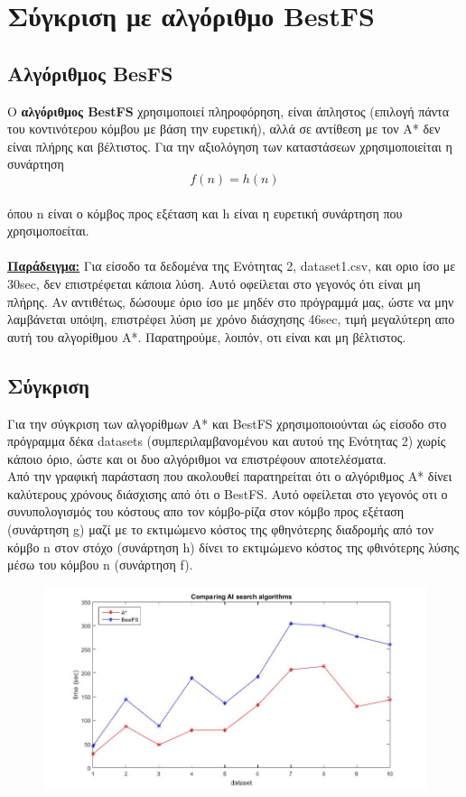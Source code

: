 \documentclass[12pt]{article}
\begin{document}
\section{Σύγκριση με αλγόριθμο BestFS}
\subsection{Αλγόριθμος BesFS}
Ο \textbf{αλγόριθμος BestFS} χρησιμοποιεί πληροφόρηση, είναι άπληστος (επιλογή πάντα του κοντινότερου κόμβου με βάση την ευρετική), αλλά σε αντίθεση με τον A* δεν είναι πλήρης και βέλτιστος.  Για την αξιολόγηση των καταστάσεων χρησιμοποιείται η συνάρτηση
 \begin{equation*}
        f(n) = h(n)
\end{equation*}\\
όπου n είναι ο κόμβος προς εξέταση και h είναι η ευρετική συνάρτηση που χρησιμοποείται.\\\\
\textbf{\underline{Παράδειγμα:}} Για είσοδο τα δεδομένα της Ενότητας 2, dataset1.csv, και οριο ίσο με 30sec, δεν επιστρέφεται κάποια λύση. Αυτό οφείλεται στο γεγονός ότι είναι μη πλήρης. Αν αντιθέτως, δώσουμε όριο ίσο με μηδέν στο πρόγραμμά μας, ώστε να μην λαμβάνεται υπόψη, επιστρέφει λύση με χρόνο διάσχησης 46sec, τιμή μεγαλύτερη απο αυτή του αλγορίθμου A*. Παρατηρούμε, λοιπόν, οτι είναι και μη βέλτιστος.
\subsection{Σύγκριση}
Για την σύγκριση των αλγορίθμων Α* και BestFS χρησιμοποιούνται ώς είσοδο στο πρόγραμμα δέκα datasets (συμπεριλαμβανομένου και αυτού της Ενότητας 2) χωρίς κάποιο όριο, ώστε και οι δυο αλγόριθμοι να επιστρέφουν αποτελέσματα.\\
Από την γραφική παράσταση που ακολουθεί παρατηρείται ότι ο αλγόριθμος A* δίνει καλύτερους χρόνους διάσχισης από ότι ο BestFS. Αυτό οφείλεται στο γεγονός οτι ο συνυπολογισμός του κόστους απο τον κόμβο-ρίζα στον κόμβο προς εξέταση (συνάρτηση g) μαζί με το εκτιμώμενο κόστος της φθηνότερης διαδρομής από τον κόμβο n στον στόχο (συνάρτηση h) δίνει το εκτιμώμενο κόστος της φθινότερης λύσης μέσω του κόμβου n (συνάρτηση f).
\begin{figure}[H]
        \centering
        \includegraphics[scale=.6]{images/ai_res}
     \end{figure}
\end{document}
